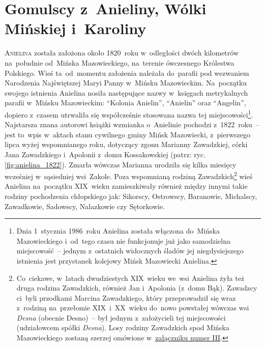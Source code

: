 
\cleardoublepage
\chapter{Gomulscy z~Anieliny, Wólki Mińskiej i~Karoliny}



{}

\lettrine{A}{nielina} została założona około 1820~roku w~odległości dwóch
kilometrów na~południe od~Mińska Mazowieckiego, na~terenie ówczesnego
Królestwa Polskiego. Wieś ta~od~momentu założenia należała do~parafii pod
wezwaniem Narodzenia Najświętszej Maryi Panny w~Mińsku Mazowieckim.
Na~początku swojego istnienia Anielina nosiła następujące nazwy w~księgach
metrykalnych parafii w~Mińsku Mazowieckim: \enquote{Kolonia Anielin},
\enquote{Anielin} oraz \enquote{Angelin}, dopiero z~czasem utrwaliła się
współcześnie stosowana nazwa tej miejscowości\footnote{Dnia 1~stycznia
1986~roku Anielina została włączona do~Mińska Mazowieckiego i~od~tego czasu
nie funkcjonuje już jako samodzielna miejscowość~-- jednym z~ostatnich
widocznych śladów jej niegdysiejszego istnienia jest przystanek kolejowy Mińsk
Mazowiecki Anielina.}. Najstarsza znana autorowi książki wzmianka o~Anielinie
pochodzi z~1822~roku~-- jest to~wpis w~aktach stanu cywilnego gminy Mińsk
Mazowiecki, z~pierwszego lipca wyżej wspomnianego roku, dotyczący zgonu
Marianny Zawadzkiej, córki Jana Zawadzkiego i~Apolonii z~domu Kossakowskiej
(patrz: ryc. \ref{fig:anielina_1822}). Zmarła wówczas Marianna urodziła się
kilka miesięcy wcześniej w~sąsiedniej wsi~Zakole. Poza wspomnianą rodziną
Zawadzkich\footnote{Co~ciekawe, w~latach dwudziestych XIX~wieku we~wsi
Anielina żyła też druga rodzina Zawadzkich, również Jan i~Apolonia (z~domu
Bąk). Zawadzcy ci~byli przodkami Marcina Zawadzkiego, który przeprowadził się
wraz z~rodziną na~przełomie XIX~i~XX~wieku do~nowo powstałej wówczas wsi
\emph{Desna} (obecnie Desno)~-- był jednym z~założycieli tej miejscowości
(udziałowcem spółki \emph{Desna}). Losy rodziny Zawadzkich spod Mińska
Mazowieckiego zostaną szerzej omówione w~\hyperref[sec:zawadzcy]{załączniku
numer III}.} wieś Anielina na~początku XIX~wieku zamieszkiwały również między
innymi takie rodziny pochodzenia chłopskiego jak: Sikorscy, Ostrowscy,
Baranowie, Michalscy, Zawadkowie, Sadowscy, Nalazkowie czy Sętorkowie.

